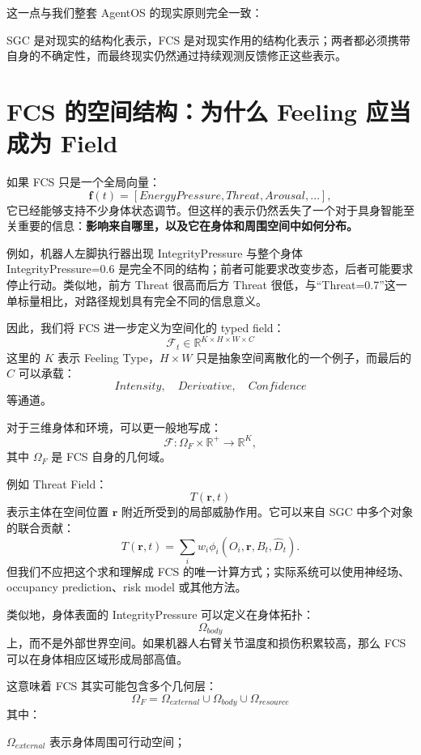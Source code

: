 这一点与我们整套 AgentOS 的现实原则完全一致：
\begin{statementbox}
\centering
{}
\end{statementbox}
SGC 是对现实的结构化表示，FCS 是对现实作用的结构化表示；两者都必须携带自身的不确定性，而最终现实仍然通过持续观测反馈修正这些表示。

\section{FCS 的空间结构：为什么 Feeling 应当成为 Field}

如果 FCS 只是一个全局向量：
\[
\mathbf f(t)
=
[
EnergyPressure,
Threat,
Arousal,\ldots
],
\]
它已经能够支持不少身体状态调节。但这样的表示仍然丢失了一个对于具身智能至关重要的信息：\textbf{影响来自哪里，以及它在身体和周围空间中如何分布。}

例如，机器人左脚执行器出现 IntegrityPressure 与整个身体 IntegrityPressure=0.6 是完全不同的结构；前者可能要求改变步态，后者可能要求停止行动。类似地，前方 Threat 很高而后方 Threat 很低，与“Threat=0.7”这一单标量相比，对路径规划具有完全不同的信息意义。

因此，我们将 FCS 进一步定义为空间化的 typed field：
\[
\boxed{
\mathcal F_t
\in
\mathbb R^{K\times H\times W\times C}
}
\]
这里的 $K$ 表示 Feeling Type，$H\times W$ 只是抽象空间离散化的一个例子，而最后的 $C$ 可以承载：
\[
Intensity,\quad
Derivative,\quad
Confidence
\]
等通道。

对于三维身体和环境，可以更一般地写成：
\[
\mathcal F:
\Omega_F\times\mathbb R^+
\rightarrow
\mathbb R^K,
\]
其中 $\Omega_F$ 是 FCS 自身的几何域。

例如 Threat Field：
\[
T(\mathbf r,t)
\]
表示主体在空间位置 $\mathbf r$ 附近所受到的局部威胁作用。它可以来自 SGC 中多个对象的联合贡献：
\[
T(\mathbf r,t)
=
\sum_i
w_i
\phi_i
(
O_i,
\mathbf r,
B_t,
\hat D_t
).
\]
但我们不应把这个求和理解成 FCS 的唯一计算方式；实际系统可以使用神经场、occupancy prediction、risk model 或其他方法。

类似地，身体表面的 IntegrityPressure 可以定义在身体拓扑：
\[
\Omega_{body}
\]
上，而不是外部世界空间。如果机器人右臂关节温度和损伤积累较高，那么 FCS 可以在身体相应区域形成局部高值。

这意味着 FCS 其实可能包含多个几何层：
\[
\boxed{
\Omega_F
=
\Omega_{external}
\cup
\Omega_{body}
\cup
\Omega_{resource}
}
\]
其中：

$\Omega_{external}$ 表示身体周围可行动空间；

